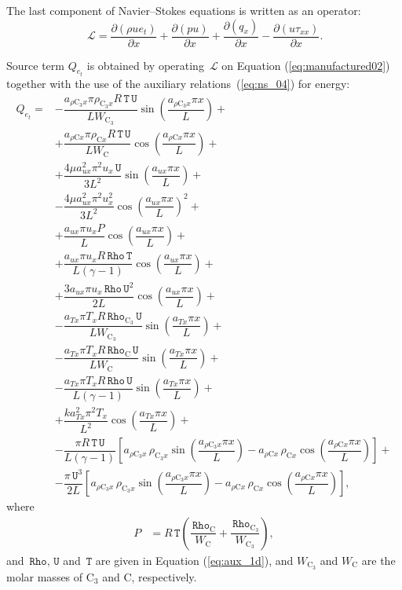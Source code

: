 \documentclass[10pt]{article}
\newcommand{\Diff}[2] {\dfrac{\partial( #1)}{\partial #2}}
\newcommand{\Lo}{\,\mathcal{L}}
\newcommand{\Rho}{\,\mathtt{Rho}}
\newcommand{\T}{\,\mathtt{T}}
\newcommand{\U}{\,\mathtt{U}}
\newcommand{\C}{\text{C}}
\begin{document}
The last component of Navier--Stokes equations is written as an operator:
\begin{equation*}
 \Lo=\Diff{\rho ue_t}{x}+ \Diff{pu}{x}+ \Diff{q_x}{x}-\Diff{u\tau_{xx}}{x} .
\end{equation*}


Source term $Q_{e_t}$ is obtained by operating $\Lo$ on Equation  (\ref{eq:manufactured02}) together with the use of the  auxiliary relations~(\ref{eq:ns_04}) for energy:
  \begin{equation}\label{eq:source_e}
 \begin{split}
Q_{e_t} = 
&-\dfrac{a_{ \rho \C_3 x } \pi \rho_{\C_3 x} R \T \U }{L W_{\C_3}}\sin\left(\dfrac{a_{ \rho \C_3 x } \pi x}{L}\right) +\\ 
&+\dfrac{a_{ \rho \C x } \pi \rho_{\C x} R \T \U }{L W_{\C}} \cos\left(\dfrac{a_{ \rho \C x } \pi x}{L}\right)+\\ 
&+\dfrac{4 \mu a_{ux}^2 \pi^2 u_x \U }{3L^2}\sin\left(\dfrac{a_{ux} \pi x}{L}\right) +\\ 
&-\dfrac{4 \mu a_{ux}^2 \pi^2 u_x^2 }{3L^2}\cos\left(\dfrac{a_{ux} \pi x}{L}\right)^2 +\\ 
&+\dfrac{a_{ux} \pi u_x P }{L}\cos\left(\dfrac{a_{ux} \pi x}{L}\right) +\\ 
&+\dfrac{a_{ux} \pi u_x R \Rho \T }{L(\gamma-1)}\cos\left(\dfrac{a_{ux} \pi x}{L}\right)+\\ 
&+ \dfrac{3a_{ux} \pi u_x \Rho \U^2 }{2L}\cos\left(\dfrac{a_{ux} \pi x}{L}\right) +\\ 
&-\dfrac{a_{Tx} \pi T_x R\Rho_{\C_3} \U }{L W_{\C_3}}\sin\left(\dfrac{a_{Tx} \pi x}{L}\right)+\\ 
&-\dfrac{a_{Tx} \pi T_x R \Rho_\C \U}{L W_\C}\sin\left(\dfrac{a_{Tx} \pi x}{L}\right)+\\ 
&-\dfrac{a_{Tx} \pi T_x R \Rho \U }{L(\gamma-1)}\sin\left(\dfrac{a_{Tx} \pi x}{L}\right) +\\ 
&+\dfrac{k a_{Tx}^2 \pi^2 T_x }{L^2}\cos\left(\dfrac{a_{Tx} \pi x}{L}\right)+\\ 
&- \dfrac{\pi R \T \U}{L(\gamma-1)}\left[a_{ \rho \C_3 x }\, \rho_{\C_3 x} \sin\left(\dfrac{a_{ \rho \C_3 x } \pi x}{L}\right)-a_{ \rho \C x }\, \rho_{\C x} \cos\left(\dfrac{a_{ \rho \C x } \pi x}{L}\right)\right]+\\ 
&- \dfrac{\pi \U^3}{2L}  \left[a_{ \rho \C_3 x } \, \rho_{\C_3 x} \sin\left(\dfrac{a_{ \rho \C_3 x } \pi x}{L}\right)-a_{ \rho \C x } \,\rho_{\C x} \cos\left(\dfrac{a_{ \rho \C x } \pi x}{L}\right)\right],
 \end{split}
\end{equation}
where
\begin{equation}
 \begin{split}\label{eq:aux_1d_02}
P &= R \T \left(\dfrac{\Rho_\C}{W_{\C}} + \dfrac{\Rho_{\C_3}}{W_{\C_3}}\right),
 \end{split}
\end{equation}
and $\Rho, \U$ and $ \T$ are given in Equation (\ref{eq:aux_1d}), and $ W_{\C_3}$ and  $W_{\C}$ are the molar masses of $\C_3$ and C, respectively. 
\end{document}
